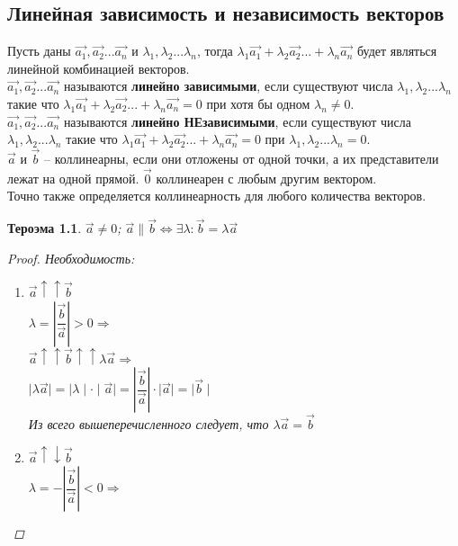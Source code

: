 \documentclass[oneside]{book}
\newtheorem{thm}{Тероэма}[chapter] %
\begin{document}
\begin{enumerate}
\begin{itemize}
\begin{enumerate}
\chapter{Линейная зависимость и независимость векторов}
Пусть даны $\vec{a_{1}},\vec{a_{2}}...\vec{a_{n}}$ и $\lambda_{1},\lambda_{2}...\lambda_{n}$, тогда $\lambda_{1}\vec{a_{1}}+\lambda_{2}\vec{a_{2}}...+\lambda_{n}\vec{a_{n}}$ будет являться линейной комбинацией векторов.\\
$\vec{a_{1}},\vec{a_{2}}...\vec{a_{n}}$ называются \textbf{линейно зависимыми}, если существуют числа $\lambda_{1},\lambda_{2}...\lambda_{n}$ такие что $\lambda_{1}\vec{a_{1}}+\lambda_{2}\vec{a_{2}}...+\lambda_{n}\vec{a_{n}}=0$ при хотя бы одном $\lambda_{n}\ne 0$.\\
$\vec{a_{1}},\vec{a_{2}}...\vec{a_{n}}$ называются \textbf{линейно НЕзависимыми}, если существуют числа $\lambda_{1},\lambda_{2}...\lambda_{n}$ такие что $\lambda_{1}\vec{a_{1}}+\lambda_{2}\vec{a_{2}}...+\lambda_{n}\vec{a_{n}}=0$ при $\lambda_{1},\lambda_{2}...\lambda_{n}=0$.\\
$\vec{a}$ и $\vec{b}$ -- коллинеарны, если они отложены от одной точки, а их представители лежат на одной прямой. $\vec{0}$ коллинеарен с любым другим вектором.\\
Точно также определяется коллинеарность для любого количества векторов.\\
\begin{thm}
		$\vec{a}\ne 0$; $\vec{a}\parallel \vec{b} \Leftrightarrow \exists \lambda: \vec{b} = \lambda \vec{a}$
		\begin{proof} 
			\par Необходимость: 
			\begin{enumerate}
				\item $\vec{a} \uparrow \uparrow \vec{b}$\\
				$\lambda = \left| \dfrac{\vec{b}}{\vec{a}}\right|>0 \Longrightarrow $\\
				$\vec{a} \uparrow \uparrow \vec{b} \uparrow \uparrow \lambda\vec{a} \Longrightarrow$\\
				$\mid \lambda\vec{a} \mid = \mid \lambda \mid \cdot \mid \vec{a} \mid = 
				\left| \dfrac{\vec{b}}{\vec{a}}\right| \cdot \mid \vec{a} \mid = \mid \vec{b} \mid$\\
				Из всего вышеперечисленного следует, что $\lambda\vec{a}=\vec{b}$
				\item $\vec{a} \uparrow \downarrow \vec{b}$\\
				$\lambda = - \left| \dfrac{\vec{b}}{\vec{a}}\right|<0 \Longrightarrow$\\

\end{enumerate}
\end{proof}
\end{thm}
\end{enumerate}
\end{itemize}
\end{enumerate}
\end{document}
